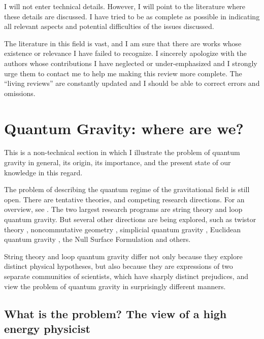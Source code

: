 I will not enter technical details.  However, I will point to the 
literature where these details are discussed.  I have tried to be as 
complete as possible in indicating all relevant aspects and potential 
difficulties of the issues discussed.

The literature in this field is vast, and I am sure that there are 
works whose existence or relevance I have failed to recognize.  I 
sincerely apologize with the authors whose contributions I have 
neglected or under-emphasized and I strongly urge them to contact me 
to help me making this review more complete.  The ``living reviews'' 
are constantly updated and I should be able to correct errors and 
omissions.

\section{Quantum Gravity: where are we?}\label{2}

This is a non-technical section in which I illustrate the problem 
of quantum gravity in general, its origin, its importance, and 
the present state of our knowledge in this regard.

The problem of describing the quantum regime of the gravitational 
field is still open.  There are tentative theories, and competing 
research directions.  For an overview, see \cite{Isham95}.  The 
two largest research programs are string theory and loop quantum 
gravity.  But several other directions are being explored, such 
as twistor theory \cite{Twistors}, noncommutative geometry 
\cite{Noncommutative}, simplicial quantum gravity 
\cite{Simplicial,Simplicial2,Simplicial3,Simplicial4}, Euclidean 
quantum gravity \cite{Euclidean,Euclidean2}, the Null Surface 
Formulation \cite{Newman,Newman2,Newman3} and others.

String theory and loop quantum gravity differ not only because 
they explore distinct physical hypotheses, but also because they 
are expressions of two separate communities of scientists, which 
have sharply distinct prejudices, and view the problem of quantum 
gravity in surprisingly different manners.

\subsection{What is the problem?  The view of a high energy 
physicist}

